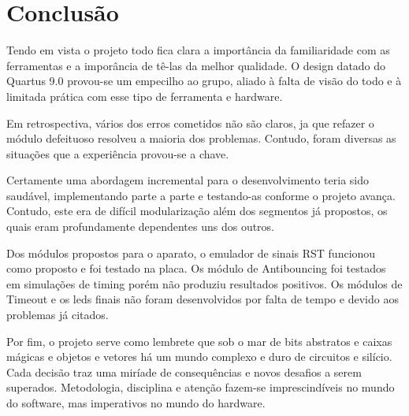 \documentclass[12pt,a4paper,openany]{abntex2}
\begin{document}
\chapter{Conclusão}

Tendo em vista o projeto todo fica clara a importância da familiaridade com as ferramentas e a imporância de tê-las da melhor qualidade. O design datado do Quartus 9.0 provou-se um empecilho ao grupo, aliado à falta de visão do todo e à limitada prática com esse tipo de ferramenta e hardware.

Em retrospectiva, vários dos erros cometidos não são claros, ja que refazer o módulo defeituoso resolveu a maioria dos problemas. Contudo, foram diversas as situações que a experiência provou-se a chave.

Certamente uma abordagem incremental para o desenvolvimento teria sido saudável, implementando parte a parte e testando-as conforme o projeto avança. Contudo, este era de difícil modularização além dos segmentos já propostos, os quais eram profundamente dependentes uns dos outros.

Dos módulos propostos para o aparato, o emulador de sinais RST funcionou como proposto e foi testado na placa. Os módulo de Antibouncing foi testados em simulações de timing porém não produziu resultados positivos. Os módulos de Timeout e os leds finais não foram desenvolvidos por falta de tempo e devido aos problemas já citados.

Por fim, o projeto serve como lembrete que sob o mar de bits abstratos e caixas mágicas e objetos e vetores há um mundo complexo e duro de circuitos  e silício. Cada decisão traz uma miríade de consequências e novos desafios a serem superados. Metodologia, disciplina e atenção fazem-se imprescindíveis no mundo do software, mas imperativos no mundo do hardware.
\end{document}
